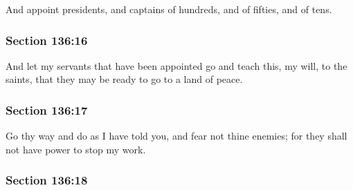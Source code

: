 		And appoint presidents, and captains of hundreds, and of fifties, and of tens.


	\subsubsection{Section 136:16} %
		\label{DC136-16}

		And let my servants that have been appointed go and teach this, my will, to the saints, that they may be ready to go to a land of peace.


	\subsubsection{Section 136:17} %
		\label{DC136-17}

		Go thy way and do as I have told you, and fear not thine enemies; for they shall not have power to stop my work.


	\subsubsection{Section 136:18} %
		\label{DC136-18}

